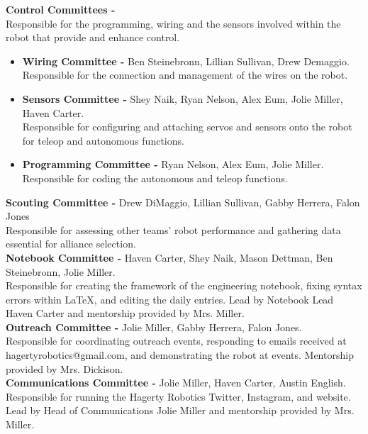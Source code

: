 \documentclass[
letterpaper, %
11pt, %
onecolumn, %
openany, %
]{dndbook}
\begin{document}
\noindent\textbf{\Large Control Committees -} \\ Responsible for the programming, wiring and the sensors involved within the robot that provide and enhance control. 

\begin{itemize}

\item \textbf{Wiring Committee -} Ben Steinebronn, Lillian Sullivan, Drew Demaggio. \\ 
Responsible for the connection and management of the wires on the robot. 

\item \textbf{Sensors Committee -} Shey Naik, Ryan Nelson, Alex Eum, Jolie Miller, Haven Carter. \\
Responsible for configuring and attaching servos and sensors onto the robot for teleop and autonomous functions. 

\item \textbf{Programming Committee -} Ryan Nelson, Alex Eum, Jolie Miller. \\ Responsible for coding the autonomous and teleop functions. 

\end{itemize} 

\noindent\textbf{\Large Scouting Committee -} Drew DiMaggio, Lillian Sullivan, Gabby Herrera, Falon Jones \\
Responsible for assessing other teams' robot performance and gathering data essential for alliance selection. \\
\newline\noindent\textbf{\Large Notebook Committee -} Haven Carter, Shey Naik, Mason Dettman, Ben Steinebronn, Jolie Miller.  \\
Responsible for creating the framework of the engineering notebook, fixing syntax errors within \LaTeX, and editing the daily entries. Lead by Notebook Lead Haven Carter and mentorship provided by Mrs. Miller. \\
\newline\noindent\textbf{\Large Outreach Committee -} Jolie Miller, Gabby Herrera, Falon Jones.  \\
Responsible for coordinating outreach events, responding to emails received at hagertyrobotics@gmail.com, and demonstrating the robot at events. Mentorship provided by Mrs. Dickison. \\
\newline\noindent\textbf{\Large Communications Committee -} Jolie Miller, Haven Carter, Austin English.  \\
Responsible for running the Hagerty Robotics Twitter, Instagram, and website. Lead by Head of Communications Jolie Miller and mentorship provided by Mrs. Miller. \\
\end{document}
